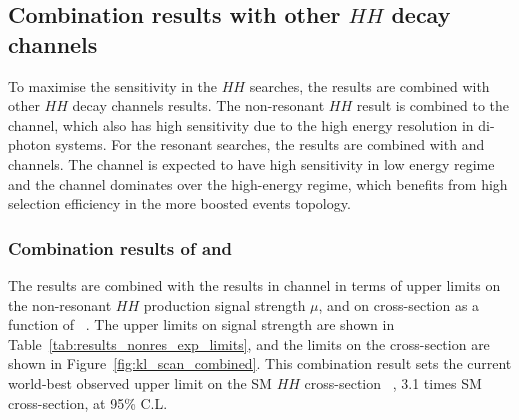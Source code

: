 \newpage

\subsection{Combination results with other  \texorpdfstring{$HH$}{HH} decay channels}
\label{sec:DiHiggs:combination-HH}
To maximise the sensitivity in the $HH$ searches, 
the \bbtt results are combined with other $HH$ decay channels results.
The \bbtt non-resonant $HH$ result is combined to the \bbyy channel, 
which also has high sensitivity due to the high energy resolution in 
di-photon systems.
For the resonant searches, the \bbtt results are combined with
\bbyy and \bbbb channels.
The \bbyy channel is expected to have high sensitivity in low energy
regime and the \bbbb channel dominates over the high-energy regime, which
benefits from high selection efficiency in the more boosted events topology.



\subsubsection{Combination results of  \texorpdfstring{\bbtt and \bbyy}{bbtt and bbyy}}

The \bbtt results are combined with the results in \bbyy channel 
in terms of upper limits on the non-resonant $HH$ production signal strength $\mu$, 
and on cross-section as a function of \kl~\cite{ATLAS-CONF-2021-052}.
The upper limits on signal strength 
are shown in Table~\ref{tab:results_nonres_exp_limits}, and the
limits on the cross-section are shown in Figure~\ref{fig:kl_scan_combined}.
This combination result sets the current world-best observed upper limit on the SM $HH$ cross-section
~\cite{PhysRevLett.122.121803,  CMS-PAS-HIG-20-004, CMS-PAS-HIG-20-005,CMS-HIG-19-018}, 3.1 times 
SM cross-section, at 95\% C.L. 

